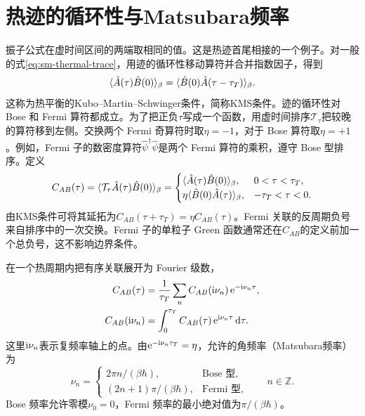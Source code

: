\section{热迹的循环性与Matsubara频率}
振子公式在虚时间区间的两端取相同的值。这是热迹首尾相接的一个例子。对一般的式\eqref{eq:sm-thermal-trace}，用迹的循环性移动算符并合并指数因子，得到
\begin{equation}
	\label{eq:sm-kms-relation}
	\langle\hat A(\tau)\hat B(0)\rangle_\beta
	= \langle\hat B(0)\hat A(\tau - \tau_T)\rangle_\beta .
\end{equation}
这称为热平衡的Kubo--Martin--Schwinger条件，简称KMS条件。迹的循环性对 Bose 和 Fermi 算符都成立。为了把正负$\tau$写成一个函数，用虚时间排序$\mathcal T_\tau$把较晚的算符移到左侧。交换两个 Fermi 奇算符时取$\eta = -1$，对于 Bose 算符取$\eta = +1$。例如，Fermi 子的数密度算符$\hat\psi^\dagger\hat\psi$是两个 Fermi 算符的乘积，遵守 Bose 型排序。定义
\begin{equation}
	\label{eq:sm-imaginary-time-correlation}
	C_{AB}(\tau) = \langle\mathcal T_\tau\hat A(\tau)\hat B(0)\rangle_\beta
	= \begin{cases}
		\langle\hat A(\tau)\hat B(0)\rangle_\beta,&0 < \tau < \tau_T,\\
		\eta\langle\hat B(0)\hat A(\tau)\rangle_\beta,&-\tau_T < \tau < 0 .
	\end{cases}
\end{equation}
由KMS条件可将其延拓为$C_{AB}(\tau + \tau_T) = \eta C_{AB}(\tau)$。Fermi 关联的反周期负号来自排序中的一次交换。Fermi 子的单粒子 Green 函数通常还在$C_{AB}$的定义前加一个总负号，这不影响边界条件。

在一个热周期内把有序关联展开为 Fourier 级数，
\begin{subequations}\label{eq:sm-matsubara-transform}
	\begin{align}
		C_{AB}(\tau) &= \frac1{\tau_T}\sum_n C_{AB}(\mathrm{i}\nu_n)\mathop{}\!\mathrm{e}^{-\mathrm{i}\nu_n\tau},\\
		C_{AB}(\mathrm{i}\nu_n) &= \int_0^{\tau_T}C_{AB}(\tau)\mathop{}\!\mathrm{e}^{\mathrm{i}\nu_n\tau}\mathop{}\!\mathrm{d}\tau .
	\end{align}
\end{subequations}
这里$\mathrm{i}\nu_n$表示复频率轴上的点。由$\mathop{}\!\mathrm{e}^{-\mathrm{i}\nu_n\tau_T} = \eta$，允许的角频率（Matsubara频率）为
\begin{equation}
	\label{eq:sm-matsubara-frequencies}
	\nu_n = \begin{cases}
		2\pi n/(\beta\hbar),&\text{Bose 型},\\
		(2n + 1)\pi/(\beta\hbar),&\text{Fermi 型},
	\end{cases}
	\qquad n \in \mathbb Z .
\end{equation}
Bose 频率允许零模$\nu_0 = 0$，Fermi 频率的最小绝对值为$\pi/(\beta\hbar)$。


